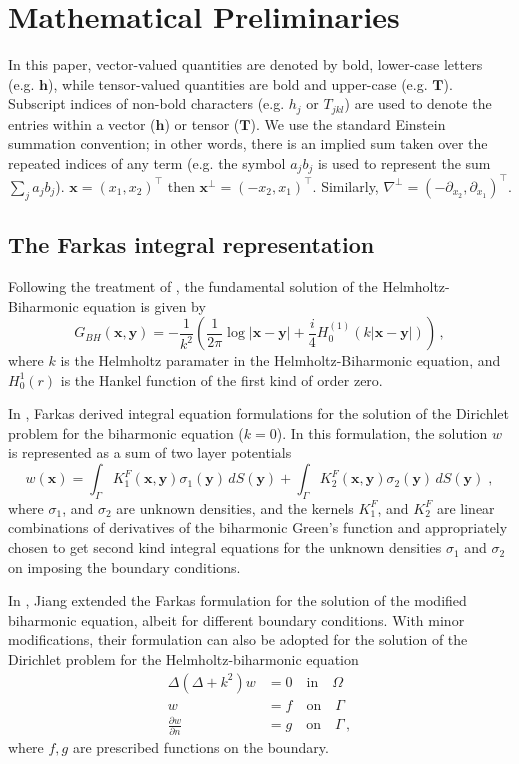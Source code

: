 \documentclass[preprint,12pt]{article}
\def\bh{{\boldsymbol h}}
\def\bT{{\boldsymbol T}}
\def\xx{{\boldsymbol x}}
\def\yy{{\boldsymbol y}}
\newcommand\dwdn{\frac{\partial w}{\partial n}}
\begin{document}
\section{Mathematical Preliminaries}

In this paper, vector-valued
quantities are denoted by bold, lower-case letters
(e.g. $\bh$), while tensor-valued quantities are bold
and upper-case (e.g. $\mathbf{T}$). 
Subscript indices of non-bold characters (e.g. $h_j$ or $T_{jkl}$)
are used to denote the entries within a vector ($\bh$) or tensor ($\bT$).
We use the standard Einstein summation convention; in other words, 
there is an implied sum taken over the repeated indices of 
any term (e.g. the symbol $a_{j} b_{j}$ is used to represent the sum
$\sum_{j} a_{j} b_{j}$).
$\xx = (x_1,x_2)^\intercal$ then $\xx^\bot = (-x_2,x_1)^\intercal$.
Similarly, $\nabla^\bot = (-\partial_{x_2},\partial_{x_1})^\intercal$.


\subsection{The Farkas integral representation}
Following the treatment of \cite{askham}, the fundamental solution
of the Helmholtz-Biharmonic equation is given by
\begin{equation}
  G_{BH}(\xx,\yy) = -\frac{1}{k^2}
  \left (\frac{1}{2\pi} \log |\xx-\yy| +
  \frac{i}{4} H_0^{(1)}(k|\xx-\yy|) \right ) \, , 
\end{equation}
where $k$ is the Helmholtz paramater in the Helmholtz-Biharmonic equation,
and $H_{0}^{1}(r)$ is the Hankel function of the first kind of order zero.

In \cite{Farkas89}, Farkas derived integral equation formulations
for the solution of the Dirichlet problem for the biharmonic equation ($k=0$). 
In this formulation, the solution 
$w$ is represented as a sum of two layer potentials
\begin{equation}
  w(\xx) = \int_\Gamma K_1^F (\xx,\yy) \sigma_1(\yy) \, dS(\yy)
  + \int_\Gamma K_2^F(\xx,\yy) \sigma_2(\yy) \, dS(\yy) \; ,
  \label{eq:farkRep}
\end{equation}
where $\sigma_{1}$, and $\sigma_{2}$ are unknown densities, and the kernels
$K_{1}^{F}$, and $K_{2}^{F}$ are linear combinations of derivatives of
the biharmonic Green's function and appropriately chosen to get second kind integral equations
for the unknown densities $\sigma_{1}$ and $\sigma_{2}$ on imposing the boundary conditions.

In \cite{shidongmodbi}, Jiang extended the Farkas formulation for the solution of the modified
biharmonic equation, albeit for different boundary conditions. With minor modifications, their formulation
can also be adopted for the solution of the Dirichlet problem for the Helmholtz-biharmonic equation
\begin{align}
\Delta (\Delta + k^2) w &= 0 \quad \text{in} \quad \Omega \label{eq:helmbi} \\
w &= f \quad \text{on} \quad \Gamma \\
\dwdn &=g \quad \text{on} \quad \Gamma \,,
\end{align}
where $f,g$ are prescribed functions on the boundary. 
\end{document}
